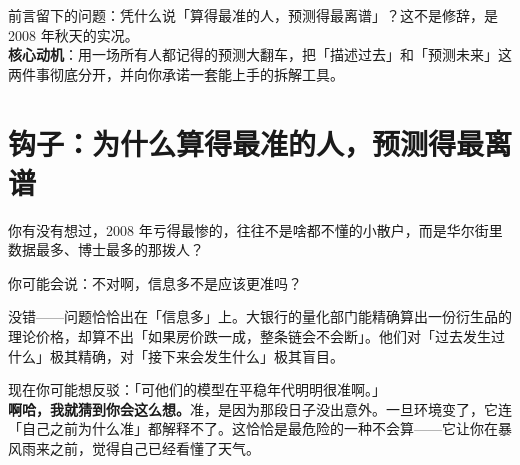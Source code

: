 \documentclass[../../main2.tex]{subfiles}
\begin{document}

\begin{motivation}
	前言留下的问题：凭什么说「算得最准的人，预测得最离谱」？这不是修辞，是 2008 年秋天的实况。\\
	\textbf{核心动机}：用一场所有人都记得的预测大翻车，把「描述过去」和「预测未来」这两件事彻底分开，并向你承诺一套能上手的拆解工具。
\end{motivation}

\begin{logicmap}
\end{logicmap}

\section{钩子：为什么算得最准的人，预测得最离谱}

你有没有想过，2008 年亏得最惨的，往往不是啥都不懂的小散户，而是华尔街里数据最多、博士最多的那拨人？

你可能会说：不对啊，信息多不是应该更准吗？

没错——问题恰恰出在「信息多」上。大银行的量化部门能精确算出一份衍生品的理论价格，却算不出「如果房价跌一成，整条链会不会断」。他们对「过去发生过什么」极其精确，对「接下来会发生什么」极其盲目。

\begin{tcolorbox}[colback=yellow!5, title=\textit{读者行为预测}]
	现在你可能想反驳：「可他们的模型在平稳年代明明很准啊。」\\
	\textbf{啊哈，我就猜到你会这么想。}准，是因为那段日子没出意外。一旦环境变了，它连「自己之前为什么准」都解释不了。这恰恰是最危险的一种不会算——它让你在暴风雨来之前，觉得自己已经看懂了天气。
\end{tcolorbox}
\end{document}
